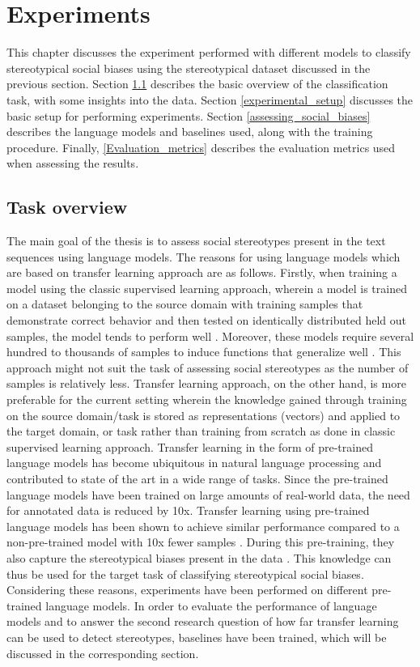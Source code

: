 \chapter{Experiments}

This chapter discusses the experiment performed with different models to classify stereotypical social biases using the stereotypical dataset discussed in the previous section. Section \ref{task_overview} describes the basic overview of the classification task, with some insights into the data. Section \ref{experimental_setup}  discusses the basic setup for performing experiments. Section \ref{assessing_social_biases} describes the language models and baselines used, along with the training procedure. Finally, \ref{Evaluation_metrics} describes the evaluation metrics used when assessing the results.

\section{Task overview}\label{task_overview}
The main goal of the thesis is to assess social stereotypes present in the text sequences using language models. The reasons for using language models which are based on transfer learning approach are as follows. Firstly, when training a model using the classic supervised learning approach, wherein a model is trained on a dataset belonging to the source domain with training samples that demonstrate correct behavior and then tested on identically distributed held out samples, the model tends to perform well \cite{ruder2019neural}. Moreover, these models require several hundred to thousands of samples to induce functions that generalize well \cite{radford2019language}. This approach might not suit the task of assessing social stereotypes as the number of samples is relatively less. Transfer learning approach, on the other hand, is more preferable for the current setting wherein the knowledge gained through training on the source domain/task is stored as representations (vectors) and applied to the target domain, or task \cite{ruder2019neural} rather than training from scratch as done in classic supervised learning approach. Transfer learning in the form of pre-trained language models has become ubiquitous in natural language processing and contributed to state of the art in a wide range of tasks\cite{ruder2019transfer}. Since the pre-trained language models have been trained on large amounts of real-world data, the need for annotated data is reduced by 10x. Transfer learning using pre-trained language models has been shown to achieve similar performance compared to a non-pre-trained model with 10x fewer samples \cite{howard2018universal}. During this pre-training, they also capture the stereotypical biases present in the data \cite{nadeem2020stereoset}. This knowledge can thus be used for the target task of classifying stereotypical social biases. Considering these reasons, experiments have been performed on different pre-trained language models. In order to evaluate the performance of language models and to answer the second research question of how far transfer learning can be used to detect stereotypes, baselines have been trained, which will be discussed in the corresponding section.

